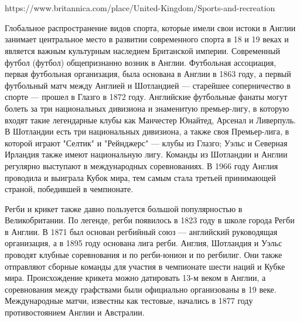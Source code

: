\section{}
\subsection{}

https://www.britannica.com/place/United-Kingdom/Sports-and-recreation

Глобальное распространение видов спорта, которые имели свои истоки в Англии занимает центральное место в развитии современного спорта в 18 и 19 веках и является важным культурным наследием Британской империи. Современный футбол (футбол) общепризнанно возник в Англии. Футбольная ассоциация, первая футбольная организация, была основана в Англии в 1863 году, а первый футбольный матч между Англией и Шотландией — старейшее соперничество в спорте — прошел в Глазго в 1872 году. Английские футбольные фанаты могут болеть за три национальных дивизиона и знаменитую премьер-лигу, в которую входят такие легендарные клубы как Манчестер Юнайтед, Арсенал и Ливерпуль. В Шотландии есть три национальных дивизиона, а также своя Премьер-лига, в которой играют "Селтик" и "Рейнджерс" --- клубы из Глазго; Уэльс и Северная Ирландия также имеют национальную лигу. Команды из Шотландии и Англии регулярно выступают в международных соревнованиях. В 1966 году Англия проводила и выиграла Кубок мира, тем самым стала третьей принимающей страной, победившей в чемпионате.

Регби и крикет также давно пользуется большой популярностью в Великобритании. По легенде, регби появилось в 1823 году в школе города Регби в Англии. В 1871 был основан регбийный союз --- английский руководящая организация, а в 1895 году основана лига регби. Англия, Шотландия и Уэльс проводят клубные соревнования  и по регби-юнион и по регбилиг. Они также отправляют сборные команды для участия в чемпионате шести наций и Кубке мира. Происхождение крикета можно датировать 13-м веком в Англии, а соревнования между графствами были официально организованы в 19 веке. Международные матчи, известны как тестовые, начались в 1877 году противостоянием Англии и Австралии.

